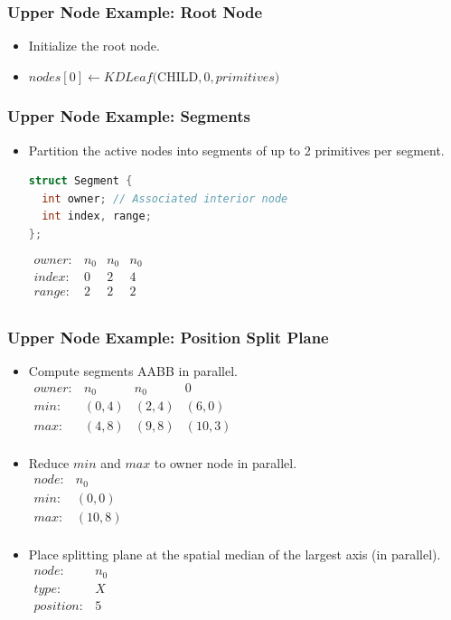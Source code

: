 \documentclass{beamer}
\begin{document}
\begin{frame}
  \frametitle{Upper Node Example: Root Node}
  
  \begin{itemize}
    \item Initialize the root node.
    \item $nodes[0] \leftarrow KDLeaf($CHILD$, 0, primitives)$
  \end{itemize}

\end{frame}

\begin{frame}[fragile]
  \frametitle{Upper Node Example: Segments}
  \begin{itemize}
  \item Partition the active nodes into segments of up to 2 primitives per
    segment.\\
  \begin{lstlisting}[language=C++]
struct Segment {
  int owner; // Associated interior node
  int index, range;
};
    \end{lstlisting}

   $\begin{array}{lccc}
    owner: & n_0 & n_0 & n_0\\
    index: & 0 & 2 & 4\\
    range: & 2 & 2 & 2\\
  \end{array}$
  \end{itemize}
\end{frame}

\begin{frame}
  \frametitle{Upper Node Example: Position Split Plane}
  
  \begin{itemize}
    \item Compute segments AABB in parallel.\\
      $\begin{array}{lccc}
      owner: & n_0 & n_0 & 0\\
      min: & (0,4) & (2,4) & (6,0)\\
      max: & (4,8) & (9,8) & (10,3)\\
    \end{array}$
    \item Reduce $min$ and $max$ to owner node in parallel.\\
      $\begin{array}{lc}
      node: & n_0 \\
      min: & (0,0)\\
      max: & (10,8)\\
    \end{array}$
    \item Place splitting plane at the spatial median of the largest axis (in
      parallel).\\
      $\begin{array}{lc}
      node: & n_0 \\
      type: & X\\
      position: & 5\\
    \end{array}$
  \end{itemize}
\end{frame}
\end{document}
